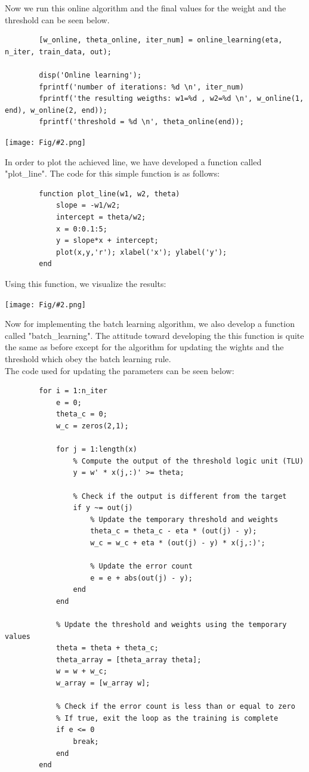 \documentclass[]{article}
\newcommand{\pict}[2]{\begin{center}
		\texttt{[image: Fig/\#2.png]}
\end{center}}
\begin{document}
	Now we run this online algorithm and the final values for the weight and the threshold can be seen below.
	\begin{lstlisting}
		[w_online, theta_online, iter_num] = online_learning(eta, n_iter, train_data, out);
		
		disp('Online learning');
		fprintf('number of iterations: %d \n', iter_num)
		fprintf('the resulting weigths: w1=%d , w2=%d \n', w_online(1, end), w_online(2, end));
		fprintf('threshold = %d \n', theta_online(end));
	\end{lstlisting}
	\pict{1}{Q2_F2}
	In order to plot the achieved line, we have developed a function called "plot\_line". The code for this simple function is as follows:
	\begin{lstlisting}
		function plot_line(w1, w2, theta)
			slope = -w1/w2;
			intercept = theta/w2;
			x = 0:0.1:5;
			y = slope*x + intercept;
			plot(x,y,'r'); xlabel('x'); ylabel('y');
		end
	\end{lstlisting}
	Using this function, we visualize the results:
	\pict{0.5}{Q2_F3}
	Now for implementing the batch learning algorithm, we also develop a function called "batch\_learning". The attitude toward developing the this function is quite the same as before except for the algorithm for updating the wights and the threshold which obey the batch learning rule.\\
	The code used for updating the parameters can be seen below:
	\begin{lstlisting}
		for i = 1:n_iter
			e = 0;
			theta_c = 0;
			w_c = zeros(2,1);
			
			for j = 1:length(x)
				% Compute the output of the threshold logic unit (TLU)
				y = w' * x(j,:)' >= theta;
				
				% Check if the output is different from the target
				if y ~= out(j)
					% Update the temporary threshold and weights
					theta_c = theta_c - eta * (out(j) - y);
					w_c = w_c + eta * (out(j) - y) * x(j,:)';
					
					% Update the error count
					e = e + abs(out(j) - y);
				end
			end
			
			% Update the threshold and weights using the temporary values
			theta = theta + theta_c;
			theta_array = [theta_array theta];
			w = w + w_c;
			w_array = [w_array w];
			
			% Check if the error count is less than or equal to zero
			% If true, exit the loop as the training is complete
			if e <= 0
				break;
			end
		end
	\end{lstlisting}
\end{document}
